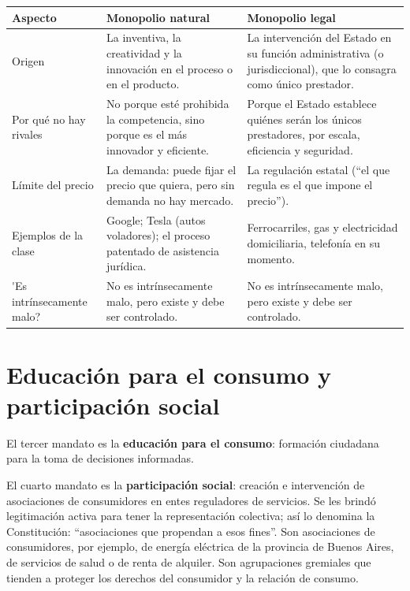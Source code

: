 \documentclass[12pt,oneside]{book}
\begin{document}
\begin{center}
{\small\renewcommand{\arraystretch}{1.25}
\begin{tabularx}{\textwidth}{@{}B{0.20\textwidth} Y Y@{}}
\toprule
\textbf{Aspecto} & \textbf{Monopolio natural} & \textbf{Monopolio legal} \\
\midrule
Origen & La inventiva, la creatividad y la innovaci\'on en el proceso o en el producto. & La intervenci\'on del Estado en su funci\'on administrativa (o jurisdiccional), que lo consagra como \'unico prestador. \\
\addlinespace
Por qu\'e no hay rivales & No porque est\'e prohibida la competencia, sino porque es el m\'as innovador y eficiente. & Porque el Estado establece qui\'enes ser\'an los \'unicos prestadores, por escala, eficiencia y seguridad. \\
\addlinespace
L\'imite del precio & La demanda: puede fijar el precio que quiera, pero sin demanda no hay mercado. & La regulaci\'on estatal (``el que regula es el que impone el precio''). \\
\addlinespace
Ejemplos de la clase & Google; Tesla (autos voladores); el proceso patentado de asistencia jur\'idica. & Ferrocarriles, gas y electricidad domiciliaria, telefon\'ia en su momento. \\
\addlinespace
\'{}Es intr\'insecamente malo? & No es intr\'insecamente malo, pero existe y debe ser controlado. & No es intr\'insecamente malo, pero existe y debe ser controlado. \\
\bottomrule
\end{tabularx}}
\end{center}

\section{Educaci\'on para el consumo y participaci\'on social}

El tercer mandato es la \textbf{educaci\'on para el consumo}: formaci\'on ciudadana para la toma de decisiones informadas.

El cuarto mandato es la \textbf{participaci\'on social}: creaci\'on e intervenci\'on de asociaciones de consumidores en entes reguladores de servicios. Se les brind\'o legitimaci\'on activa para tener la representaci\'on colectiva; as\'i lo denomina la Constituci\'on: ``asociaciones que propendan a esos fines''. Son asociaciones de consumidores, por ejemplo, de energ\'ia el\'ectrica de la provincia de Buenos Aires, de servicios de salud o de renta de alquiler. Son agrupaciones gremiales que tienden a proteger los derechos del consumidor y la relaci\'on de consumo.
\end{document}
